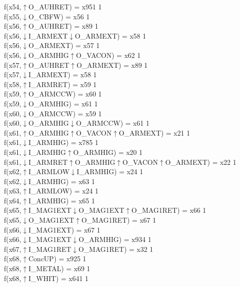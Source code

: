 f(x54,$\uparrow$O\_AUHRET) = x951 {1} \\
f(x55,$\downarrow$O\_CBFW) = x56 {1} \\
f(x56,$\uparrow$O\_AUHRET) = x89 {1} \\
f(x56,$\downarrow$I\_ARMEXT$\downarrow$O\_ARMEXT) = x58 {1} \\
f(x56,$\downarrow$O\_ARMEXT) = x57 {1} \\
f(x56,$\downarrow$O\_ARMHIG$\uparrow$O\_VACON) = x62 {1} \\
f(x57,$\uparrow$O\_AUHRET$\uparrow$O\_ARMEXT) = x89 {1} \\
f(x57,$\downarrow$I\_ARMEXT) = x58 {1} \\
f(x58,$\uparrow$I\_ARMRET) = x59 {1} \\
f(x59,$\uparrow$O\_ARMCCW) = x60 {1} \\
f(x59,$\downarrow$O\_ARMHIG) = x61 {1} \\
f(x60,$\downarrow$O\_ARMCCW) = x59 {1} \\
f(x60,$\downarrow$O\_ARMHIG$\downarrow$O\_ARMCCW) = x61 {1} \\
f(x61,$\uparrow$O\_ARMHIG$\uparrow$O\_VACON$\uparrow$O\_ARMEXT) = x21 {1} \\
f(x61,$\downarrow$I\_ARMHIG) = x785 {1} \\
f(x61,$\downarrow$I\_ARMHIG$\uparrow$O\_ARMHIG) = x20 {1} \\
f(x61,$\downarrow$I\_ARMRET$\uparrow$O\_ARMHIG$\uparrow$O\_VACON$\uparrow$O\_ARMEXT) = x22 {1} \\
f(x62,$\uparrow$I\_ARMLOW$\downarrow$I\_ARMHIG) = x24 {1} \\
f(x62,$\downarrow$I\_ARMHIG) = x63 {1} \\
f(x63,$\uparrow$I\_ARMLOW) = x24 {1} \\
f(x64,$\uparrow$I\_ARMHIG) = x65 {1} \\
f(x65,$\uparrow$I\_MAG1EXT$\downarrow$O\_MAG1EXT$\uparrow$O\_MAG1RET) = x66 {1} \\
f(x65,$\downarrow$O\_MAG1EXT$\uparrow$O\_MAG1RET) = x67 {1} \\
f(x66,$\downarrow$I\_MAG1EXT) = x67 {1} \\
f(x66,$\downarrow$I\_MAG1EXT$\downarrow$O\_ARMHIG) = x934 {1} \\
f(x67,$\uparrow$I\_MAG1RET$\downarrow$O\_MAG1RET) = x32 {1} \\
f(x68,$\uparrow$ConcUP) = x925 {1} \\
f(x68,$\uparrow$I\_METAL) = x69 {1} \\
f(x68,$\uparrow$I\_WHIT) = x641 {1} \\
